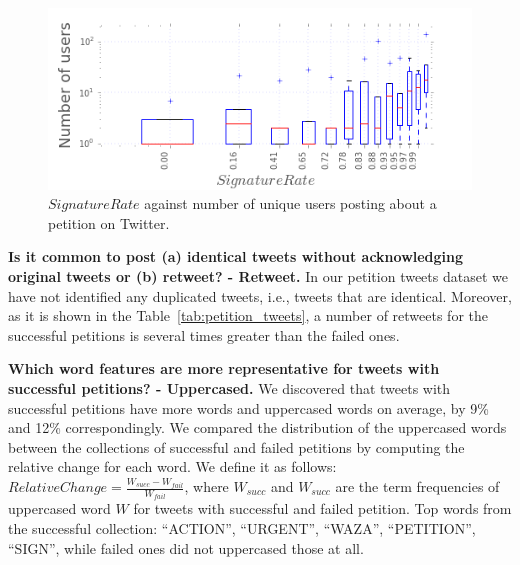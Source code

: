 \begin{figure}
\centering
\includegraphics[width=\columnwidth]{figures/signaturesgoalVSnumusersCampaigns.png}
\caption{$SignatureRate$ against number of unique users posting about a petition on Twitter.}
\label{fig:signatures_vs_users}
\end{figure}

\textbf{Is it common to post (a) identical tweets without acknowledging original tweets or (b) retweet? - Retweet.} In our petition tweets dataset we have not identified any duplicated tweets, i.e., tweets that are identical. Moreover, as it is shown in the Table~\ref{tab:petition_tweets}, a number of retweets for the successful petitions is several times greater than the failed ones.

\textbf{Which word features are more representative for tweets with successful petitions? - Uppercased.} We discovered that tweets with successful petitions have more words and uppercased words on average, by 9\% and 12\% correspondingly. We compared the distribution of the uppercased words between the collections of successful and failed petitions by computing the relative change for each word. We define it as follows: $RelativeChange = \frac{W_{succ} - W_{fail}}{W_{fail}}$, where $W_{succ}$ and $W_{succ}$ are the term frequencies of uppercased word $W$ for tweets with successful and failed petition. Top words from the successful collection: ``ACTION'', ``URGENT'', ``WAZA'', ``PETITION'', ``SIGN'', while failed ones did not uppercased those at all.
